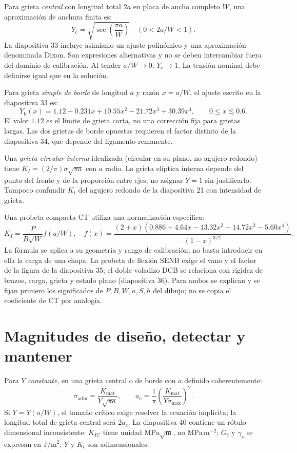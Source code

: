 Para grieta \emph{central} con longitud total $2a$ en placa de ancho completo $W$, una aproximación de anchura finita es:
\begin{equation}
Y_{\mathrm c}=\sqrt{\sec\left(\frac{\pi a}{W}\right)}
\quad(0<2a/W<1).
\label{eq:clase-central}
\end{equation}
La diapositiva 33 incluye asimismo un ajuste polinómico y una aproximación denominada Dixon. Son expresiones alternativas y no se deben intercambiar fuera del dominio de calibración. Al tender $a/W\to0$, $Y_{\mathrm c}\to1$. La tensión nominal debe definirse igual que en la solución.

Para grieta \emph{simple de borde} de longitud $a$ y razón $x=a/W$, el ajuste escrito en la diapositiva 33 es:
\begin{equation}
Y_{\mathrm b}(x)=1.12-0.231x+10.55x^2-21.72x^3+30.39x^4,
\qquad 0\le x\lesssim0.6.
\label{eq:clase-borde}
\end{equation}
El valor $1.12$ es el límite de grieta corta, no una corrección fija para grietas largas. Las dos grietas de borde opuestas requieren el factor distinto de la diapositiva 34, que depende del ligamento remanente.

Una \emph{grieta circular interna} idealizada (circular en su plano, no agujero redondo) tiene $K_I=(2/\pi)\sigma\sqrt{\pi a}$ con $a$ radio. La grieta elíptica interna depende del punto del frente y de la proporción entre ejes; no asignar $Y=1$ sin justificarlo. Tampoco confundir $K_t$ del agujero redondo de la diapositiva 21 con intensidad de grieta.

Una probeta compacta CT utiliza una normalización específica:
\[
K_I=\frac{P}{B\sqrt W}f(a/W),\quad
f(x)=\frac{(2+x)(0.886+4.64x-13.32x^2+14.72x^3-5.60x^4)}
{(1-x)^{3/2}}.
\]
La fórmula se aplica a su geometría y rango de calibración; no basta introducir en ella la carga de una chapa. La probeta de flexión SENB exige el vano y el factor de la figura de la diapositiva 35; el doble voladizo DCB se relaciona con rigidez de brazos, carga, grieta y estado plano (diapositiva 36). Para ambos se explican y se fijan primero los significados de $P,B,W,a,S,h$ del dibujo; no se copia el coeficiente de CT por analogía.

\section{Magnitudes de diseño, detectar y mantener}
Para $Y$ \emph{constante}, en una grieta central o de borde con $a$ definido coherentemente:
\begin{equation}
\sigma_{\mathrm{adm}}=\frac{K_{\mathrm{mat}}}{Y\sqrt{\pi a}},
\qquad a_c=\frac1\pi\left(\frac{K_{\mathrm{mat}}}{Y\sigma_{\max}}\right)^2.
\label{eq:clase-disenyo}
\end{equation}
Si $Y=Y(a/W)$, el tamaño crítico exige resolver la ecuación implícita; la longitud total de grieta central será $2a_c$. La diapositiva 40 contiene un rótulo dimensional inconsistente: $K_{IC}$ tiene unidad $\mathrm{MPa}\sqrt{\mathrm m}$, no $\mathrm{MPa\,m^{-2}}$; $G_c$ y $\gamma_s$ se expresan en $\mathrm{J/m^2}$; $Y$ y $K_t$ son adimensionales.

